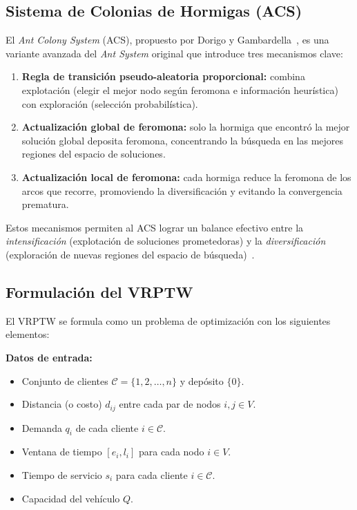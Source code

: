 \documentclass[12pt, letterpaper]{article}
\begin{document}
\subsection{Sistema de Colonias de Hormigas (ACS)}
\label{subsec:acs}

El \textit{Ant Colony System} (ACS), propuesto por Dorigo y Gambardella~\cite{dorigo1997}, es una variante avanzada del \textit{Ant System} original que introduce tres mecanismos clave:

\begin{enumerate}[leftmargin=2cm]
  \item \textbf{Regla de transición pseudo-aleatoria proporcional:} combina explotación (elegir el mejor nodo según feromona e información heurística) con exploración (selección probabilística).
  \item \textbf{Actualización global de feromona:} solo la hormiga que encontró la mejor solución global deposita feromona, concentrando la búsqueda en las mejores regiones del espacio de soluciones.
  \item \textbf{Actualización local de feromona:} cada hormiga reduce la feromona de los arcos que recorre, promoviendo la diversificación y evitando la convergencia prematura.
\end{enumerate}

Estos mecanismos permiten al ACS lograr un balance efectivo entre la \textit{intensificación} (explotación de soluciones prometedoras) y la \textit{diversificación} (exploración de nuevas regiones del espacio de búsqueda)~\cite{dorigo1997}.

\subsection{Formulación del VRPTW}
\label{subsec:vrptw_formulacion}

El VRPTW se formula como un problema de optimización con los siguientes elementos:

\textbf{Datos de entrada:}
\begin{itemize}[leftmargin=2cm]
  \item Conjunto de clientes $\mathcal{C} = \{1, 2, \ldots, n\}$ y depósito $\{0\}$.
  \item Distancia (o costo) $d_{ij}$ entre cada par de nodos $i, j \in V$.
  \item Demanda $q_i$ de cada cliente $i \in \mathcal{C}$.
  \item Ventana de tiempo $[e_i, l_i]$ para cada nodo $i \in V$.
  \item Tiempo de servicio $s_i$ para cada cliente $i \in \mathcal{C}$.
  \item Capacidad del vehículo $Q$.
\end{itemize}
\end{document}
